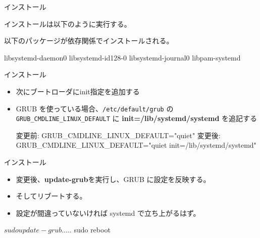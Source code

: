 \begin{frame}[containsverbatim]{インストール}

インストールは以下のように実行する。


以下のパッケージが依存関係でインストールされる。
\begin{commandline}
libsystemd-daemon0
libsystemd-id128-0
libsystemd-journal0
libpam-systemd
\end{commandline}

\end{frame}

\begin{frame}[containsverbatim]{インストール}

\begin{itemize}
\item 次にブートローダにinit指定を追加する
\item GRUB を使っている場合、\texttt{/etc/default/grub} の
\texttt{GRUB\_CMDLINE\_LINUX\_DEFAULT} に {\bf init=/lib/systemd/systemd} を追記する
 
\begin{commandline}
変更前:
GRUB_CMDLINE_LINUX_DEFAULT="quiet"
変更後:
GRUB_CMDLINE_LINUX_DEFAULT="quiet init=/lib/systemd/systemd"
\end{commandline} 

\end{itemize}

\end{frame}

\begin{frame}[containsverbatim]{インストール}

\begin{itemize}
\item 変更後、{\bf update-grub}を実行し、GRUB に設定を反映する。
\item そしてリブートする。
\item 設定が間違っていないければ systemd で立ち上がるはず。
\end{itemize}

\begin{commandline}
$ sudo update-grub
.....
$ sudo reboot 
\end{commandline}

\end{frame}

